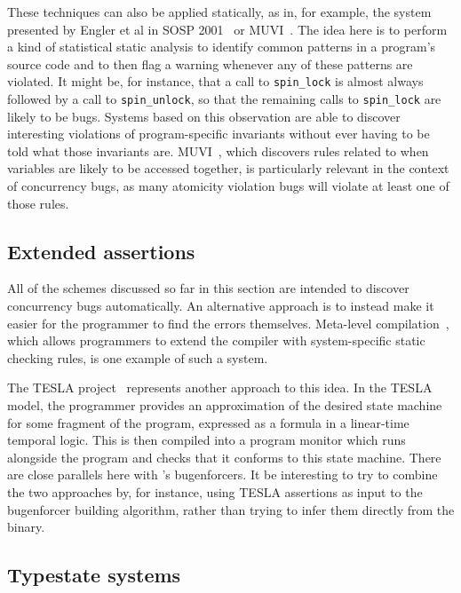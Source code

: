 These techniques can also be applied statically, as in, for example,
the system presented by Engler et al in SOSP
2001~\cite{Engler2001} or MUVI~\cite{Lu2007}.  The idea
here is to perform a kind of statistical static analysis to identify
common patterns in a program's source code and to then flag a warning
whenever any of these patterns are violated.  It might be, for
instance, that a call to \texttt{spin\_lock} is almost always followed
by a call to \texttt{spin\_unlock}, so that the remaining calls to
\texttt{spin\_lock} are likely to be bugs.  Systems based on this
observation are able to discover interesting violations of
program-specific invariants without ever having to be told what those
invariants are.  MUVI~\cite{Lu2007}, which discovers rules related to
when variables are likely to be accessed together, is particularly
relevant in the context of concurrency bugs, as many atomicity
violation bugs will violate at least one of those rules.

\subsection{Extended assertions}

All of the schemes discussed so far in this section are intended to
discover concurrency bugs automatically.  An alternative approach is
to instead make it easier for the programmer to find the errors
themselves.  Meta-level compilation~\cite{Engler2000a}, which allows
programmers to extend the compiler with system-specific static
checking rules, is one example of such a system.

The TESLA project~\cite{Watson2013} represents another approach to this idea.  In the TESLA model,
the programmer provides an approximation of the desired state machine
for some fragment of the program, expressed as a formula in a
linear-time temporal logic.  This is then compiled into a program
monitor which runs alongside the program and checks that it conforms
to this state machine.  There are close parallels here with
{\technique}'s \glspl{bugenforcer}.  It be interesting to try to
combine the two approaches by, for instance, using TESLA assertions as
input to the \gls{bugenforcer} building algorithm, rather than trying
to infer them directly from the binary.

\subsection{Typestate systems}

